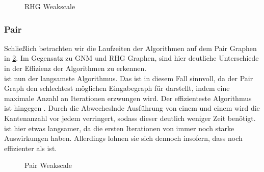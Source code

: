 \begin{figure}[H]
    \centering
    
    
    
    
    \caption{RHG Weakscale}
    \label{RHG-graphs-Img}
\end{figure}





\subsubsection{Pair}
Schließlich betrachten wir die Laufzeiten der Algorithmen auf dem Pair Graphen in \cref{Pair-graphs-Img}. Im Gegensatz zu GNM und RHG Graphen, sind hier deutliche Unterschiede in der Effizienz der Algorithmen zu erkennen.\\
\boruvkaAllreduce ist nun der langsamste Algorithmus. Das ist in diesem Fall sinnvoll, da der Pair Graph den schlechtest möglichen Eingabegraph für \boruvkasAlgorithmus \space darstellt, indem eine maximale Anzahl an Iterationen erzwungen wird.
Der effizienteste Algorithmus ist hingegen \boruvkaMixedMerge. Durch die Abwecheslnde Ausführung von einem \boruvkaStep \space und einem \mergeStep \space wird die Kantenanzahl vor jedem \boruvkaStep verringert, sodass dieser deutlich weniger Zeit benötigt.\\
\boruvkaThenMerge ist hier etwas langsamer, da die ersten Iterationen von \boruvkasAlgorithmus \space immer noch starke Auswirkungen haben. Allerdings lohnen sie sich dennoch insofern, dass \boruvkaThenMerge noch effizienter als \mergeMST ist.

\begin{figure}[H]
    \centering
    
    
    
    
    \caption{Pair Weakscale}
    \label{Pair-graphs-Img}
\end{figure}


